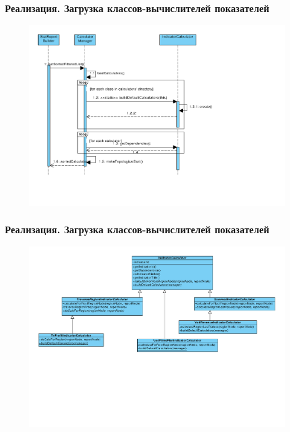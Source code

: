 \documentclass{beamer}
\begin{document}
\begin{frame}[t]
\frametitle{Реализация. Загрузка классов-вычислителей показателей}
\begin{figure}
\begin{center}
\vspace{-1cm}
\hspace*{0.5cm} \includegraphics[scale=0.43]{../resources/uml/CalculatorLoading.pdf}
\end{center}
\end{figure}
\end{frame}

\begin{frame}[t]
\frametitle{Реализация. Загрузка классов-вычислителей показателей}
\begin{figure}
\begin{center}
\vspace{0cm}
\hspace*{-1cm} \includegraphics[scale=0.43]{../resources/uml/StatReportIndicatorCalculator.pdf}
\end{center}
\end{figure}
\end{frame}
\end{document}
